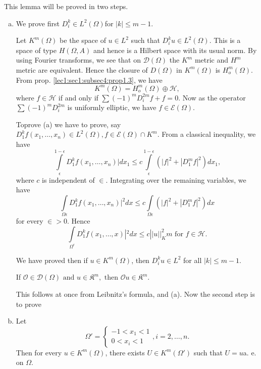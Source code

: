 This lemma will be proved in two steps. 
\begin{enumerate}[(a)]
\item We prove first $D^k_i \in L^2 (\Omega)$for $|k| \leq m-1$. 

  Let $K^m(\Omega)$ be the space of $ u \in L^2$ such that $D^k_i u \in L^2
  (\Omega)$. This is a space of type $H(\Omega, A)$ and hence is a
  Hilbert space with its usual norm. By using Fourier transforms, we see
  that on $\mathscr{D}(\Omega)$ the $K^m$ metric and $H^m$
  metric are equivalent. Hence the closure of $D(\Omega)$ in
  $K^m(\Omega)$ is $H^m_o(\Omega)$. From prop. \ref{lec1:sec1:subsec4:prop1.3}, we have  
  $$
  K^m(\Omega) = H^m_o(\Omega) \oplus \mathscr{H}, 
  $$
  where $f \in \mathscr{H}$ if and only if $\sum (-1)^m D^{2m}_i
  f + f =0$. Now as the operator $\sum (-1)^m D^{2m}_i$ is uniformly
  elliptic, we have $ f \in \mathscr{E} (\Omega)$.  
  
  To\pageoriginale prove (a) we have to prove, say $D^k_1 f(x_1, \ldots , x_n)
  \in L^2 (\Omega), f \in \mathscr{E} (\Omega) \cap
  K^m$. From a classical inequality, we have  
  $$
  \int \limits^{1-\epsilon}_{\epsilon}D^k_1 f(x_1, \ldots ,
  x_n)|dx_1 \leq c\int
  \limits^{1-\epsilon}_{\epsilon}(|f|^2+|D^m_1f|^2)dx_1,  
  $$
  where $c$ is independent of $\in$. Integrating over the
  remaining variables, we have  
  $$
  \int\limits_{\Omega \epsilon}D^k_1 f(x_1, \ldots , x_n)|^2 dx \leq
  c\int \limits_{\Omega \epsilon}(|f|^2+|D^m_1f|^2)dx 
  $$
  for every $\in > 0$. Hence 
  $$
  \int\limits_{\Omega^\epsilon}D^k_1 f(x_1, \ldots , x)|^2 dx \leq c
  ||u||^2_K m \text{ for } f \in \mathscr{H}.  
  $$
  
  We have proved then if $u \in K^m (\Omega)$, then
  $D^k_i u \in L^2$ for all $|k|\leq m-1$.  
  
  \begin{coro*}%
    If $\mathscr{O} \in \mathscr{D}(\Omega) \text{ and } u
    \in \mathfrak{K}^m, \text{ then } \mathscr{O} u \in
    \mathfrak{K}^m$.  
  \end{coro*}
  
  This follows at once from Leibnitz's formula, and (a). Now the
  second step is to prove 
\item
  Let 
  $$
  \Omega'=
  \begin{cases}
    -1 < x_1 < 1 \\
    0 < x_i < 1
  \end{cases}
  , i=2, \ldots , n.
  $$
  Then for every $u \in K^m (\Omega)$, there exists
  $U \in K^m (\Omega')$  such that $U=u$a. e. on
  $\Omega$. 
  

\end{enumerate}
